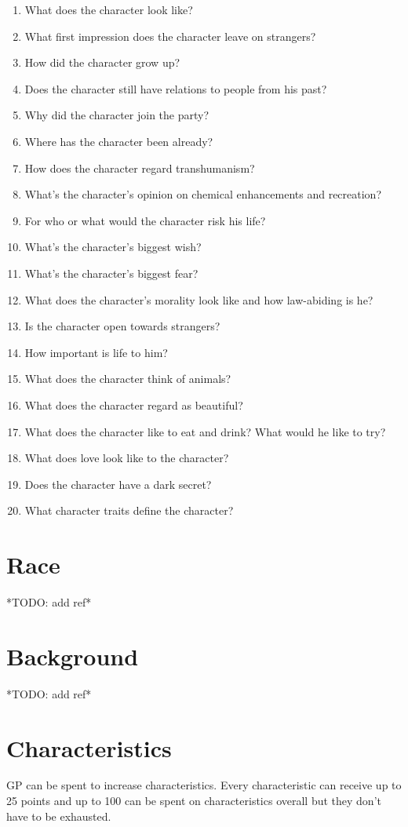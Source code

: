 \documentclass[12pt,a4paper]{book}
\begin{document}
	\begin{enumerate}
		\setlength\itemsep{-8mm}
		\item What does the character look like?
		\item What first impression does the character leave on strangers?
		\item How did the character grow up?
		\item Does the character still have relations to people from his past?
		\item Why did the character join the party?
		\item Where has the character been already?
		\item How does the character regard transhumanism?
		\item What’s the character’s opinion on chemical enhancements and recreation?
		\item For who or what would the character risk his life?
		\item What’s the character’s biggest wish?
		\item What’s the character’s biggest fear?
		\item What does the character’s morality look like and how law-abiding is he?
		\item Is the character open towards strangers?
		\item How important is life to him?
		\item What does the character think of animals?
		\item What does the character regard as beautiful?
		\item What does the character like to eat and drink? What would he like to try?
		\item What does love look like to the character?
		\item Does the character have a dark secret?
		\item What character traits define the character?
	\end{enumerate}
	\section{Race}
	*TODO: add ref*
	\section{Background}
	*TODO: add ref*
	\section{Characteristics}
	GP can be spent to increase characteristics. Every characteristic can receive up to 25 points and up to 100 can be spent on characteristics overall but they don’t have to be exhausted.
\end{document}
